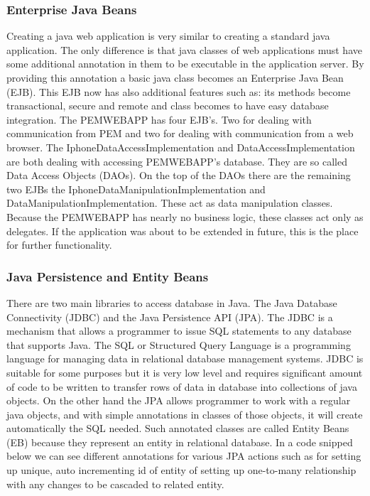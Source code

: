 \documentclass[12pt, a4paper]{report}   %
\begin{document}
\begin{enumerate}
\subsubsection{Enterprise Java Beans}
Creating a java web application is very similar to creating a standard java application. The only difference is that java classes of web applications must have some additional annotation in them to be executable in the application server. By providing this annotation a basic java class becomes an Enterprise Java Bean (EJB). This EJB now has also additional features such as: its methods become transactional, secure and remote and class becomes to have easy database integration. The PEMWEBAPP has four EJB's. Two for dealing with communication from PEM and two for dealing with communication from a web browser. The IphoneDataAccessImplementation and DataAccessImplementation are both dealing with accessing PEMWEBAPP's database. They are so called Data Access Objects (DAOs). On the top of the DAOs there are the remaining two EJBs the IphoneDataManipulationImplementation and DataManipulationImplementation. These act as data manipulation classes. Because the PEMWEBAPP has nearly no business logic, these classes act only as delegates. If the application was about to be extended in future, this is the place for further functionality.


\subsubsection{Java Persistence and Entity Beans}
There are two main libraries to access database in Java. The Java Database Connectivity (JDBC) and the Java Persistence API (JPA). The JDBC is a mechanism that allows a programmer to issue SQL statements to any database that supports Java. The SQL or Structured Query Language is a programming language for managing data in relational database management systems. JDBC is suitable for some purposes but it is very low level and requires significant amount of code to be written to transfer rows of data in database into collections of java objects. On the other hand the JPA allows programmer to work with a regular java objects, and with simple annotations in classes of those objects, it will create automatically the SQL needed. Such annotated classes are called Entity Beans (EB) because they represent an entity in relational database. In a code snipped below we can see different annotations for various JPA actions such as for setting up unique, auto incrementing id of entity of setting up one-to-many relationship with any changes to be cascaded to related entity.



\end{enumerate}
\end{document}
